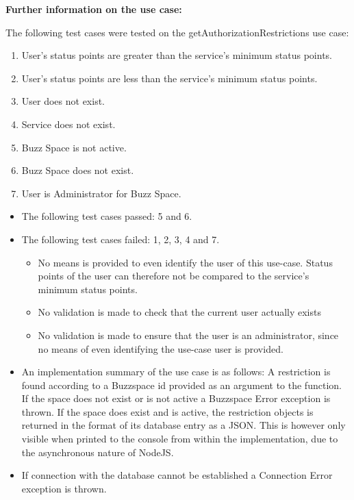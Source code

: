 \noindent
\medskip

\textbf{Further information on the use case:}
\noindent

The following test cases were tested on the getAuthorizationRestrictions use case:
\begin{enumerate}
	\item User's status points are greater than the service's minimum status points.
	\item User's status points are less than the service's minimum status points.
	\item User does not exist.
  	\item Service does not exist.
  	\item Buzz Space is not active.
  	\item Buzz Space does not exist.
  	\item User is Administrator for Buzz Space.
\end{enumerate}
\medskip
\begin{itemize}
\item The following test cases passed:  5 and 6.
	
\item The following test cases failed: 1, 2, 3, 4 and 7.
	\begin{itemize}
		\item No means is provided to even identify the user of this use-case. Status points of the user can therefore not be compared to the service's minimum status points.
		\item No validation is made to check that the current user actually exists
		\item No validation is made to ensure that the user is an administrator, since no means of even identifying the use-case user is provided.
	\end{itemize}

	\item An implementation summary of the use case is as follows: A restriction is found according to a Buzzspace id provided as an argument to the function. If the space does not exist or is not active a Buzzspace Error exception is thrown. If the space does exist and is active, the restriction objects is returned in the format of its database entry as a JSON. This is however only visible when printed to the console from within the implementation, due to the asynchronous nature of NodeJS.

\item If connection with the database cannot be established a Connection Error exception is thrown.

\end{itemize}